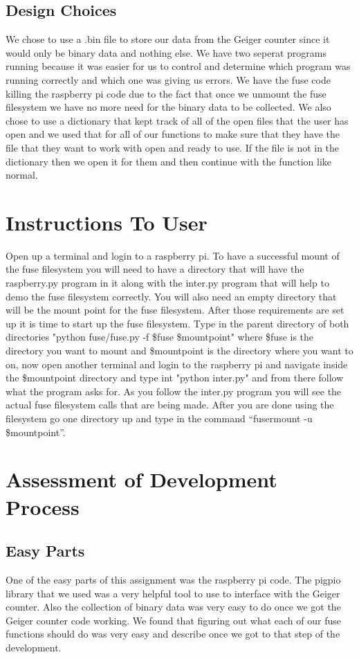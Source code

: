 \documentclass{paper}
\begin{document}
\begin{doublespace}
\subsection{Design Choices}
We chose to use a .bin file to store our data from the Geiger counter since it would only be binary data and nothing else. We have two seperat programs running because it was easier for us to control and determine which program was running correctly and which one was giving us errors. We have the fuse code killing the raspberry pi code due to the fact that once we unmount the fuse filesystem we have no more need for the binary data to be collected. We also chose to use a dictionary that kept track of all of the open files that the user has open and we used that for all of our functions to make sure that they have the file that they want to work with open and ready to use. If the file is not in the dictionary then we open it for them and then continue with the function like normal. 
\section{Instructions To User}
Open up a terminal and login to a raspberry pi. To have a successful mount of the fuse filesystem you will need to have a directory that will have the raspberry.py program in it along with the inter.py program that will help to demo the fuse filesystem correctly. You will also need an empty directory that will be the mount point for the fuse filesystem. After those requirements are set up it is time to start up the fuse filesystem. Type in the parent directory of both directories "python fuse/fuse.py -f \$fuse \$mountpoint" where \$fuse is the directory you want to mount and \$mountpoint is the directory where you want to on, now open another terminal and login to the raspberry pi and navigate inside the \$mountpoint directory and type int "python inter.py" and from there follow what the program asks for.
As you follow the inter.py program you will see the actual fuse filesystem calls that are being made. After you are done using the filesystem go one directory up and type in the command ``fusermount -u \$mountpoint''.  
\section{Assessment of Development Process}
\subsection{Easy Parts}
One of the easy parts of this assignment was the raspberry pi code. The pigpio library that we used was a very helpful tool to use to interface with the Geiger counter. Also the collection of binary data was very easy to do once we got the Geiger counter code working. We found that figuring out what each of our fuse functions should do was very easy and describe once we got to that step of the development. 

\end{doublespace}
\end{document}
